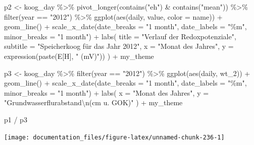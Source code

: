 \documentclass[
]{article}
\newenvironment{Shaded}{\begin{snugshade}}{\end{snugshade}}
\newcommand{\AttributeTok}[1]{\textcolor[rgb]{0.77,0.63,0.00}{#1}}
\newcommand{\FunctionTok}[1]{\textcolor[rgb]{0.00,0.00,0.00}{#1}}
\newcommand{\NormalTok}[1]{#1}
\newcommand{\OtherTok}[1]{\textcolor[rgb]{0.56,0.35,0.01}{#1}}
\newcommand{\SpecialCharTok}[1]{\textcolor[rgb]{0.00,0.00,0.00}{#1}}
\newcommand{\StringTok}[1]{\textcolor[rgb]{0.31,0.60,0.02}{#1}}
\begin{document}
\begin{Shaded}
\begin{Highlighting}[]
\NormalTok{p2 }\OtherTok{\textless{}{-}}\NormalTok{ koog\_day }\SpecialCharTok{\%\textgreater{}\%}
  \FunctionTok{pivot\_longer}\NormalTok{(}\FunctionTok{contains}\NormalTok{(}\StringTok{"eh"}\NormalTok{) }\SpecialCharTok{\&} \FunctionTok{contains}\NormalTok{(}\StringTok{"mean"}\NormalTok{)) }\SpecialCharTok{\%\textgreater{}\%}
  \FunctionTok{filter}\NormalTok{(year }\SpecialCharTok{==} \StringTok{"2012"}\NormalTok{) }\SpecialCharTok{\%\textgreater{}\%}
  \FunctionTok{ggplot}\NormalTok{(}\FunctionTok{aes}\NormalTok{(daily, value, }\AttributeTok{color =}\NormalTok{ name)) }\SpecialCharTok{+}
  \FunctionTok{geom\_line}\NormalTok{()  }\SpecialCharTok{+}
  \FunctionTok{scale\_x\_date}\NormalTok{(}\AttributeTok{date\_breaks =} \StringTok{"1 month"}\NormalTok{, }\AttributeTok{date\_labels =} \StringTok{"\%m"}\NormalTok{, }\AttributeTok{minor\_breaks =} \StringTok{"1 month"}\NormalTok{) }\SpecialCharTok{+}
  \FunctionTok{labs}\NormalTok{(}
    \AttributeTok{title =} \StringTok{"Verlauf der Redoxpotenziale"}\NormalTok{,}
    \AttributeTok{subtitle =} \StringTok{"Speicherkoog für das Jahr 2012"}\NormalTok{,}
    \AttributeTok{x =} \StringTok{"Monat des Jahres"}\NormalTok{,}
    \AttributeTok{y =} \FunctionTok{expression}\NormalTok{(}\FunctionTok{paste}\NormalTok{(E[H], }\StringTok{" (mV)"}\NormalTok{))}
\NormalTok{  ) }\SpecialCharTok{+} 
\NormalTok{  my\_theme}

\NormalTok{p3 }\OtherTok{\textless{}{-}}\NormalTok{ koog\_day }\SpecialCharTok{\%\textgreater{}\%}
  \FunctionTok{filter}\NormalTok{(year }\SpecialCharTok{==} \StringTok{"2012"}\NormalTok{) }\SpecialCharTok{\%\textgreater{}\%}
  \FunctionTok{ggplot}\NormalTok{(}\FunctionTok{aes}\NormalTok{(daily, wt\_2)) }\SpecialCharTok{+}
  \FunctionTok{geom\_line}\NormalTok{() }\SpecialCharTok{+}
  \FunctionTok{scale\_x\_date}\NormalTok{(}\AttributeTok{date\_breaks =} \StringTok{"1 month"}\NormalTok{, }\AttributeTok{date\_labels =} \StringTok{"\%m"}\NormalTok{, }\AttributeTok{minor\_breaks =} \StringTok{"1 month"}\NormalTok{) }\SpecialCharTok{+}
  \FunctionTok{labs}\NormalTok{(}
    \AttributeTok{x =} \StringTok{"Monat des Jahres"}\NormalTok{,}
    \AttributeTok{y =} \StringTok{"Grundwasserflurabstand}\SpecialCharTok{\textbackslash{}n}\StringTok{(cm u. GOK)"}
\NormalTok{  ) }\SpecialCharTok{+} 
\NormalTok{  my\_theme}

\NormalTok{p1 }\SpecialCharTok{/}\NormalTok{ p3  }
\end{Highlighting}
\end{Shaded}

\begin{center}\texttt{[image: documentation\_files/figure-latex/unnamed-chunk-236-1]} \end{center}
\end{document}

